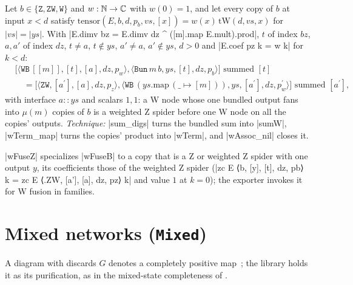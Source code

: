 \begin{lemma}
Let $b\in\{\mathtt Z,\mathtt{ZW},\mathtt W\}$ and $w:\mathbb{N}\to\mathbb{C}$ with $w(0)=1$, and let every copy of $b$
at input $x<d$ satisfy $\mathrm{tensor}(E,b,d,p_b,vs,[x])=w(x)\,\mathrm{tW}(d,vs,x)$ for
$|vs|=|ys|$. With \lean|E.dimv bz = E.dimv dz ^ ([m].map E.mult).prod|, $t$ of index $bz$, $a,a'$ of
index $dz$, $t\ne a$, $t\notin ys$, $a'\ne a$, $a'\notin ys$, $d>0$ and
\lean|E.coef pz k = w k| for $k<d$:
\[\begin{aligned}&\bigl[\langle\mathtt{WB}\,[[m]],[t],[a],dz,p_w\rangle,\langle\mathtt{Bun}\,m\,b,ys,[t],dz,p_b\rangle\bigr]\text{ summed }[t]\\
&\quad=\bigl[\langle\mathtt{ZW},[a^{\prime}],[a],dz,p_z\rangle,\langle\mathtt{WB}\,(ys.\mathrm{map}\,(\_\mapsto[m])),ys,[a^{\prime}],dz,p^{\prime}_w\rangle\bigr]
\text{ summed }[a^{\prime}],\end{aligned}\]
with interface $a{::}ys$ and scalars $1,1$: a W node whose one bundled output fans into $\mu(m)$
copies of $b$ is a weighted Z spider before one W node on all the copies' outputs.
\emph{Technique:} \lean|sum_digs| turns the bundled sum into \lean|sumW|, \lean|wTerm_map| turns the
copies' product into \lean|wTerm|, and \lean|wAssoc_nil| closes it.
\end{lemma}
\lean|wFuseZ| specializes \lean|wFuseB| to a copy that is a Z or weighted Z spider with one output
$y$, its coefficients those of the weighted Z spider
(\lean|zc E ⟨b, [y], [t], dz, pb⟩ k = zc E ⟨.ZW, [a'], [a], dz, pz⟩ k| and value $1$ at $k=0$); the
exporter invokes it for W fusion in families.

\section{Mixed networks (\texttt{Mixed})}\label{sec:lean-core-mixed}

A diagram with discards $G$ denotes a completely positive map~\cite{selinger2007cpm}; the library
holds it as its purification, as in the mixed-state completeness of
\citet{carette2019mixed}.

